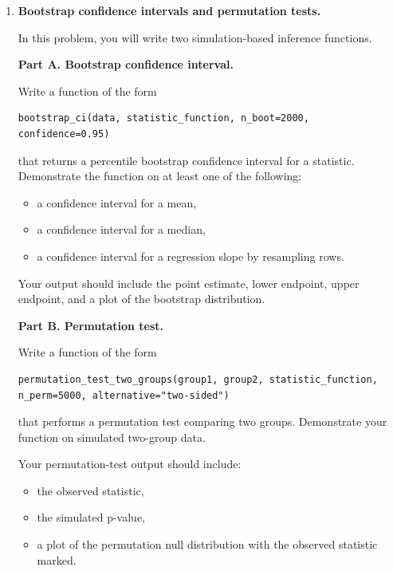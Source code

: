\documentclass[11pt]{article}
\begin{document}
\begin{enumerate}
Briefly explain your results. Your explanation should mention which methods are expected to work better for linear versus nonlinear class boundaries, why stratified splitting or stratified cross-validation is useful, and why training accuracy alone is not sufficient.

\newpage

\item \textbf{Bootstrap confidence intervals and permutation tests.}

In this problem, you will write two simulation-based inference functions.

\textbf{Part A. Bootstrap confidence interval.}

Write a function of the form

\begin{lstlisting}
bootstrap_ci(data, statistic_function, n_boot=2000, confidence=0.95)
\end{lstlisting}

that returns a percentile bootstrap confidence interval for a statistic. Demonstrate the function on at least one of the following:

\begin{itemize}
    \item a confidence interval for a mean,
    \item a confidence interval for a median,
    \item a confidence interval for a regression slope by resampling rows.
\end{itemize}

Your output should include the point estimate, lower endpoint, upper endpoint, and a plot of the bootstrap distribution.

\textbf{Part B. Permutation test.}

Write a function of the form

\begin{lstlisting}
permutation_test_two_groups(group1, group2, statistic_function, n_perm=5000, alternative="two-sided")
\end{lstlisting}

that performs a permutation test comparing two groups. Demonstrate your function on simulated two-group data.

Your permutation-test output should include:

\begin{itemize}
    \item the observed statistic,
    \item the simulated p-value,
    \item a plot of the permutation null distribution with the observed statistic marked.
\end{itemize}


\end{enumerate}
\end{document}
